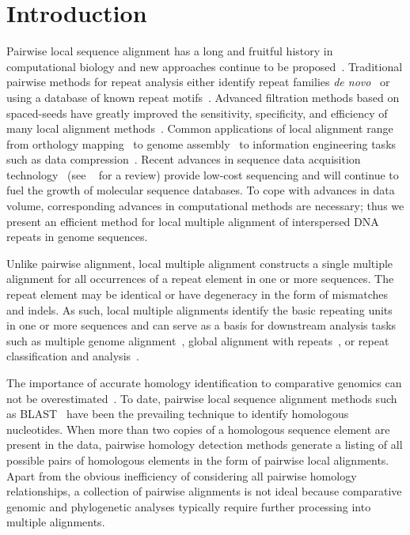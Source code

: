 \documentclass[12pt,journal,letterpaper,onecolumn, draftcls]{IEEEtran}
\begin{document}
\section{Introduction}
Pairwise local sequence alignment has a long and fruitful history in computational biology and new approaches continue to be proposed~\cite{ref-pattern,ref-chaos,ref-yass,ref-kahveciMAP}. Traditional pairwise methods for repeat analysis either identify repeat families \textit{de novo}~\cite{ref-reputer} or using a database of known repeat motifs~\cite{ref-repbase}. Advanced filtration methods based on spaced-seeds have greatly improved the sensitivity, specificity, and efficiency of many local alignment methods~\cite{ref-zhang04,ref-zhang06,ref-buhler05,ref-xu04,ref-batzoglouNAR, ref-rasmussen}. Common applications of local alignment range from orthology mapping~\cite{ref-orthomcl} to genome assembly~\cite{ref-arachne2} to information engineering tasks such as data compression~\cite{ref-ane}. Recent advances in sequence data acquisition technology~\cite{ref-454, sequencing, hybrid} (see ~\cite{ref-nextgenseq} for a review) provide low-cost sequencing and will continue to fuel the growth of molecular sequence databases. To cope with advances in data volume, corresponding advances in computational methods are necessary; thus we present an efficient method for local multiple alignment of interspersed DNA repeats in genome sequences.

Unlike pairwise alignment, local multiple alignment constructs a single multiple alignment for all occurrences of a repeat element in one or more sequences.  The repeat element may be identical or have degeneracy in the form of mismatches and indels.  As such, local multiple alignments identify the basic repeating units in one or
more sequences and can serve as a basis for downstream analysis tasks such as multiple genome alignment~\cite{ref-mauve,ref-mga,ref-mgcat,ref-deweyReview}, global alignment with repeats~\cite{ref-otherSammethPaper,ref-aba}, or repeat classification and analysis~\cite{ref-piler}.

The importance of accurate homology identification to comparative genomics can not be overestimated~\cite{Kumar07}. To date, pairwise local sequence alignment methods such as BLAST~\cite{ref-blastz,ref-ssearch} have been the prevailing technique to identify homologous nucleotides. When more than two copies of a homologous sequence element are present in the data, pairwise homology detection methods generate a listing of all possible pairs of homologous elements in the form of pairwise local alignments.  Apart from the obvious inefficiency of considering all pairwise homology relationships, a collection of pairwise alignments is not ideal because comparative genomic and phylogenetic analyses typically require further processing into multiple alignments.
\end{document}
